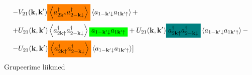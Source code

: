 \documentclass[class=article, crop=false]{standalone}
\newcommand{\mathcolorbox}[2]{\colorbox{#1}{$\displaystyle #2$}}
\begin{document}
\begin{equation}
\begin{split}
		- & V_{ 2 1} ( \mathbf{k}, \mathbf{k}') \mathcolorbox{orange}{\left\langle a^{ \dagger}_{ 2 \mathbf{k} \uparrow} a^{ \dagger}_{ 2 -\mathbf{k} \downarrow} \right\rangle} \left\langle a_{ 1 -\mathbf{k}' \downarrow} a_{ 1 \mathbf{k}' \uparrow} \right\rangle + \\ 
		+ & U_{ 2 1} ( \mathbf{k}, \mathbf{k}') \left\langle a^{ \dagger}_{ 2 \mathbf{k} \uparrow} a^{ \dagger}_{ 2 -\mathbf{k} \downarrow} \right\rangle \mathcolorbox{green}{a_{ 1 -\mathbf{k}' \downarrow} a_{ 1 \mathbf{k}' \uparrow}} + U_{ 2 1} ( \mathbf{k}, \mathbf{k}') \mathcolorbox{teal}{a^{ \dagger}_{ 2 \mathbf{k} \uparrow} a^{ \dagger}_{ 2 -\mathbf{k} \downarrow}} \left\langle a_{ 1 -\mathbf{k}' \downarrow} a_{ 1 \mathbf{k}' \uparrow} \right\rangle - \\
		- & U_{ 2 1} ( \mathbf{k}, \mathbf{k}') \mathcolorbox{orange}{\left\langle a^{ \dagger}_{ 2 \mathbf{k} \uparrow} a^{ \dagger}_{ 2 -\mathbf{k} \downarrow} \right\rangle} \left\langle a_{ 1 -\mathbf{k}' \downarrow} a_{ 1 \mathbf{k}' \uparrow} \right\rangle ]
	\end{split}
\end{equation}
Grupeerime liikmed
\end{document}
